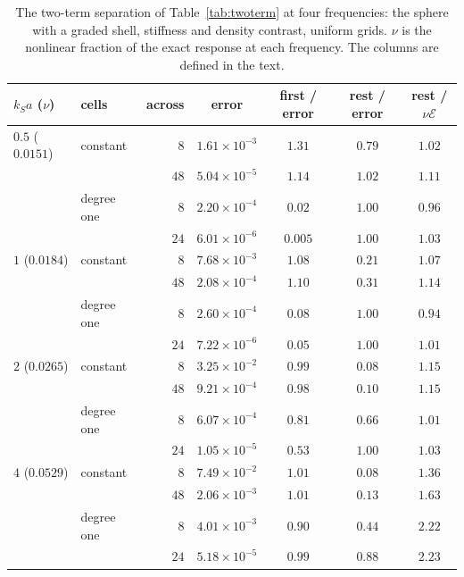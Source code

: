 \documentclass[11pt,a4paper]{article}
\newcommand{\cE}{\mathcal{E}}
\begin{document}
\begin{table}[htbp]
\centering
\caption{The two-term separation of Table~\ref{tab:twoterm} at four frequencies: the sphere with a graded
shell, stiffness and density contrast, uniform grids. $\nu$ is the nonlinear fraction of the exact response
at each frequency. The columns are defined in the text.}\label{tab:twotermfreq}
\small
\begin{tabular}{@{}llrcccc@{}}
\toprule
$k_Sa$ ($\nu$) & cells & across & error & first / error & rest / error & rest / $\nu\cE$ \\
\midrule
$0.5$ ($0.0151$) & constant & $8$ & $1.61\times10^{-3}$ & $1.31$ & $0.79$ & $1.02$ \\
 & & $48$ & $5.04\times10^{-5}$ & $1.14$ & $1.02$ & $1.11$ \\
 & degree one & $8$ & $2.20\times10^{-4}$ & $0.02$ & $1.00$ & $0.96$ \\
 & & $24$ & $6.01\times10^{-6}$ & $0.005$ & $1.00$ & $1.03$ \\
\midrule
$1$ ($0.0184$) & constant & $8$ & $7.68\times10^{-3}$ & $1.08$ & $0.21$ & $1.07$ \\
 & & $48$ & $2.08\times10^{-4}$ & $1.10$ & $0.31$ & $1.14$ \\
 & degree one & $8$ & $2.60\times10^{-4}$ & $0.08$ & $1.00$ & $0.94$ \\
 & & $24$ & $7.22\times10^{-6}$ & $0.05$ & $1.00$ & $1.01$ \\
\midrule
$2$ ($0.0265$) & constant & $8$ & $3.25\times10^{-2}$ & $0.99$ & $0.08$ & $1.15$ \\
 & & $48$ & $9.21\times10^{-4}$ & $0.98$ & $0.10$ & $1.15$ \\
 & degree one & $8$ & $6.07\times10^{-4}$ & $0.81$ & $0.66$ & $1.01$ \\
 & & $24$ & $1.05\times10^{-5}$ & $0.53$ & $1.00$ & $1.03$ \\
\midrule
$4$ ($0.0529$) & constant & $8$ & $7.49\times10^{-2}$ & $1.01$ & $0.08$ & $1.36$ \\
 & & $48$ & $2.06\times10^{-3}$ & $1.01$ & $0.13$ & $1.63$ \\
 & degree one & $8$ & $4.01\times10^{-3}$ & $0.90$ & $0.44$ & $2.22$ \\
 & & $24$ & $5.18\times10^{-5}$ & $0.99$ & $0.88$ & $2.23$ \\
\bottomrule
\end{tabular}
\end{table}
\end{document}
